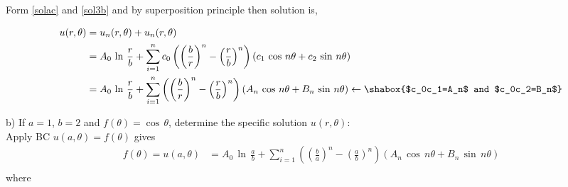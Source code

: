Form \eqref{solac} and \eqref{sol3b}  and by superposition principle then  solution is,

\begin{align}
u(r,\theta)&=u_n(r,\theta)+u_n(r,\theta)\\
&=A_0\,\ln\,\frac{r}{b}+\sum_{i=1}^nc_0\left(\left(\frac{b}{r}\right)^n-\left(\frac{r}{b}\right)^n\right)(c_1\,\cos\,n\theta+c_2\,\sin\,n\theta)\nonumber\\
&=A_0\,\ln\,\frac{r}{b}+\sum_{i=1}^n\left(\left(\frac{b}{r}\right)^n-\left(\frac{r}{b}\right)^n\right)(A_n\,\cos\,n\theta+B_n\,\sin\,n\theta)\leftarrow\shabox{$c_0c_1=A_n$ and $c_0c_2=B_n$}\label{so1a}
\end{align}

b) If $a=1$, $b=2$ and $f(\theta)=\cos\,\theta$, determine the specific solution $u(r,\theta)$:\\
Apply BC $u(a,\theta)=f(\theta)$ gives
\begin{align}
f(\theta)=u(a,\theta)&=A_0\,\ln\,\frac{a}{b}+\sum_{i=1}^n\left(\left(\frac{b}{a}\right)^n-\left(\frac{a}{b}\right)^n\right)(A_n\,\cos\,n\theta+B_n\,\sin\,n\theta)\\
\end{align}
where
